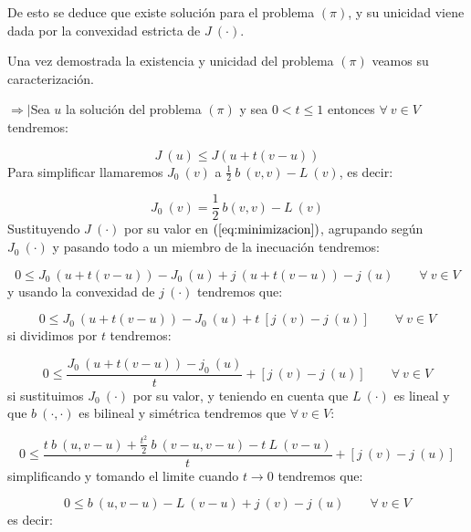 \begin{demoslema}
\begin{itemize}
\end{itemize}

De esto se deduce que existe soluci\'on para el problema $(\pi )$, y su unicidad
viene dada por la convexidad estricta de $J\ (\cdot )$.\newline

Una vez demostrada la existencia y unicidad del problema $(\pi )$ veamos su
caracterizaci\'on.\newline

$\Rightarrow |$Sea $u$ la soluci\'on del problema $(\pi )$ y sea $0<t\le 1$
entonces $\forall \ v \in V$ tendremos:

\begin{equation} \label{eq:minimizacion}
J\ (u) \le J(u+t(v-u))
\end{equation}
Para simplificar llamaremos $J_0\ (v)$ a $\frac{1}{2}\ b\ (v,v)-L\ (v)$, es
decir:

\begin{displaymath}
J_0\ (v) = \frac{1}{2}\ b(v,v)-L\ (v)
\end{displaymath}
Sustituyendo $J\ (\cdot )$ por su valor en $(\ref{eq:minimizacion})$, agrupando
seg\'un $J_0\ (\cdot)$ y pasando todo a un miembro de la inecuaci\'on
tendremos:

\begin{displaymath}
0 \le J_0\ (u+t(v-u))-J_0\ (u)+j\ (u+t(v-u))-j\ (u) \qquad \forall \ v \in V
\end{displaymath}
y usando la convexidad de $j\ (\cdot )$ tendremos que:

\begin{displaymath}
0 \le J_0\ (u+t(v-u))-J_0\ (u)+t\ [j\ (v)-j\ (u)]\qquad \forall \ v \in V
\end{displaymath}
si dividimos por $t$ tendremos:

\begin{displaymath} 
0 \le \frac{J_0\ (u+t(v-u))-j_0\ (u)}{t} +[j\ (v)-j\ (u)]\qquad \forall 
\ v \in V
\end{displaymath}
si sustituimos $J_0\ (\cdot )$  por su valor, y teniendo en cuenta que
$L\ (\cdot )$ es lineal y que $b\ (\cdot ,\cdot )$ es bilineal y sim\'etrica
tendremos que $\forall \ v \in V$:

\begin{displaymath}
0 \le \frac{t\ b\ (u,v-u)+\frac{t^2}{2}\ b\ (v-u,v-u)-t\ L\ (v-u)}{t} +
[j\ (v)-j\ (u)]
\end{displaymath}
simplificando y tomando el limite cuando $t \to 0$ tendremos que:

\begin{displaymath}
0 \le b\ (u,v-u)-L\ (v-u)+j\ (v)-j\ (u) \qquad \forall \ v \in V
\end{displaymath}
es decir:


\end{demoslema}
